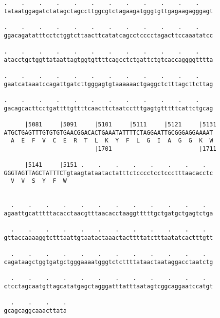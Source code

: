 \documentclass{article}
\begin{document}
\begin{Verbatim}
.    .    .    .    .    .    .    .    .    .    .    .    
tataatggagatctatagctagccttggcgtctagaagatgggtgttgagaagagggagt
                                                            
.    .    .    .    .    .    .    .    .    .    .    .    
ggacagatatttcctctggtcttaacttcatatcagcctcccctagacttccaaatatcc
                                                            
.    .    .    .    .    .    .    .    .    .    .    .    
atacctgctggttataattagtggtgttttcagcctctgattctgtcaccaggggtttta
                                                            
.    .    .    .    .    .    .    .    .    .    .    .    
gaatcataaatccagattgatcttgggagtgtaaaaaactgaggctctttagcttcttag
                                                            
.    .    .    .    .    .    .    .    .    .    .    .    
gacagcacttcctgattttgttttcaacttctaatcctttgagtgtttttcattctgcag
                                                            
      |5081     |5091     |5101     |5111     |5121     |5131
ATGCTGAGTTTGTGTGTGAACGGACACTGAAATATTTTCTAGGAATTGCGGGAGGAAAAT
  A  E  F  V  C  E  R  T  L  K  Y  F  L  G  I  A  G  G  K  W
                          |1701                         |1711
  
      |5141     |5151 .    .    .    .    .    .    .    .  
GGGTAGTTAGCTATTTCTgtaagtataatactatttctcccctcctccctttaacacctc
  V  V  S  Y  F  W                                          
                                                            
  
  .    .    .    .    .    .    .    .    .    .    .    .  
agaattgcatttttacacctaacgtttaacacctaaggtttttgctgatgctgagtctga
                                                            
  .    .    .    .    .    .    .    .    .    .    .    .  
gttaccaaaaggtctttaattgtaatactaaactacttttatctttaatatcactttgtt
                                                            
  .    .    .    .    .    .    .    .    .    .    .    .  
cagataagctggtgatgctgggaaaatgggtctcttttataactaataggacctaatctg
                                                            
  .    .    .    .    .    .    .    .    .    .    .    .  
ctcctagcaatgttagcatatgagctagggatttatttaatagtcggcaggaatccatgt
                                                            
  .    .    .    .
gcagcaggcaaacttata
                  

\end{Verbatim}
\end{document}
